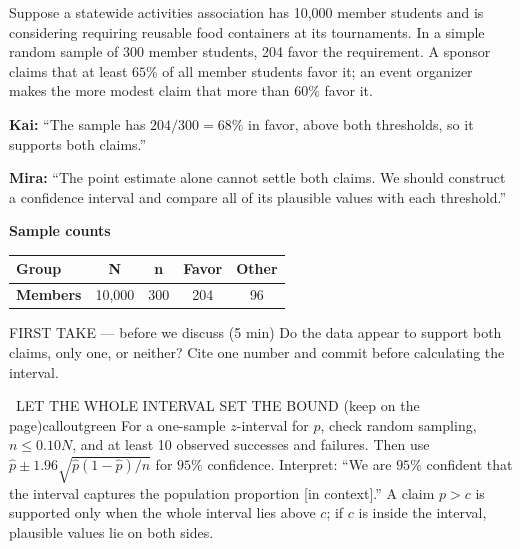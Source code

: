 \documentclass[11pt]{article}
\begin{document}


Suppose a statewide activities association has 10,000 member students and is considering requiring reusable food containers at its tournaments. In a simple random sample of 300 member students, 204 favor the requirement. A sponsor claims that at least $65\%$ of all member students favor it; an event organizer makes the more modest claim that more than $60\%$ favor it.\par\smallskip \textbf{Kai:} ``The sample has $204/300=68\%$ in favor, above both thresholds, so it supports both claims.''\par \textbf{Mira:} ``The point estimate alone cannot settle both claims. We should construct a confidence interval and compare all of its plausible values with each threshold.''\par
\begin{center}
\textbf{Sample counts}\par\smallskip
\begin{tabular}{|l|c|c|c|c|}
\hline
\textbf{Group} & \textbf{N} & \textbf{n} & \textbf{Favor} & \textbf{Other} \\ \hline
\textbf{Members} & 10,000 & 300 & 204 & 96 \\ \hline
\end{tabular}
\end{center}
\begin{firsttakebox}{FIRST TAKE --- before we discuss (5 min)}
Do the data appear to support both claims, only one, or neither? Cite one number and commit before calculating the interval.
\workspace{0.9in}
\end{firsttakebox}

\begin{callout}{\IconBook\ LET THE WHOLE INTERVAL SET THE BOUND (keep on the page)}{calloutgreen}
For a one-sample $z$-interval for $p$, check random sampling, $n\le0.10N$, and at least
10 observed successes and failures. Then use $\hat p\pm1.96\sqrt{\hat p(1-\hat p)/n}$
for $95\%$ confidence. Interpret: ``We are $95\%$ confident that the interval captures
the population proportion [in context].'' A claim $p>c$ is supported only when the whole
interval lies above $c$; if $c$ is inside the interval, plausible values lie on both sides.
\end{callout}
\end{document}
